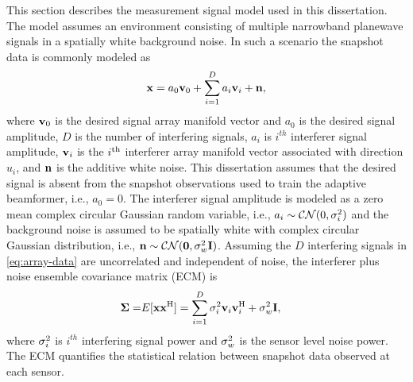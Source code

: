 This section describes the measurement signal model used in this
dissertation. The model assumes an environment consisting of multiple
narrowband planewave signals in a spatially white background noise. In
such a scenario the snapshot data is commonly modeled as
\begin{equation}
  \label{eq:array-data} {\bf x} = a_0{\bf v}_0 + \sum\limits_{i=1}^D a_i{\bf v}_i +
{\bf n},
\end{equation}
where ${\bf v}_0$ is the desired signal array manifold vector and $a_0$
is the desired signal amplitude, $D$ is the number of interfering
signals, $a_i$ is $i^{th}$ interferer signal amplitude, ${\bf v}_i$ is
the $i^{\rm th}$ interferer array manifold vector associated with direction
$u_i$, and ${\bf n}$ is the additive white noise. This dissertation
assumes that the desired signal is absent from the snapshot
observations used to train the adaptive beamformer, i.e., $a_0 =
0$.
The interferer signal amplitude is modeled as a zero mean complex
circular Gaussian random variable, i.e.,
$a_i \sim \cnormal{0, \cov_i^2}$ and the background noise is assumed
to be spatially white with complex circular Gaussian distribution,
i.e., $\noisevec \sim \cnormal{\mathbf{0}, \cov_w^2\eye}$. Assuming
the $D$ interfering signals in \eqref{eq:array-data} are uncorrelated
and independent of noise, the interferer plus noise ensemble
covariance matrix (ECM) is
\begin{align}
  \label{eq:ecm} \boldsymbol{\Sigma} =& E[{\bf x}{\bf x}^{\rm H}] = \sum\limits_{i =
1}^D\sigma_i^2{\bf v}_i{\bf v}_i^{\rm H} + \sigma_w^2{\bf I},
\end{align}
where $\sigma_i^2$ is $i^{th}$ interfering signal power and $\sigma_w^2$
is the sensor level noise power. The ECM quantifies the statistical
relation between snapshot data observed at each sensor.


